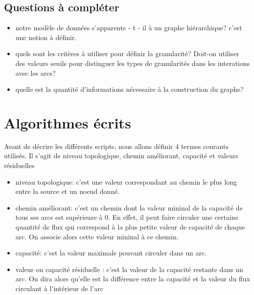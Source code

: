 \documentclass[onecolumn, 12pt]{article}
\begin{document}
\subsection {Questions \`a compl\'eter}
\begin{itemize}
\item notre mod\`ele de donn\'ees s'apparente - t - il \`a un graphe hi\'erarchique? c'est une notion \`a d\'efinir.
\item quels sont les crit\`eres \`a utiliser pour d\'efinir la granularit\'e? Doit-on utiliser des valeurs seuils pour distinguer les types de granularit\'es dans les interations avec les arcs?  
\item quelle est la quantit\'e d'informations n\'ecessaire \`a la construction du graphe?
\end{itemize}

\section {Algorithmes \'ecrits}

Avant de d\'ecrire les diff\'erents scripts, nous allons d\'efinir 4 termes courants utilis\'es. Il s'agit de niveau topologique, chemin am\'eliorant,  capacit\'e et valeurs r\'esiduelles 
\begin{itemize}
\item niveau topologique: c'est une valeur correspondant au chemin le plus long entre la source et un noeud donn\'e.
\item chemin am\'eliorant: c'est un chemin dont la valeur mininal de la capacit\'e de tous ses arcs est sup\'erieure \`a 0. En effet, il peut faire circuler une certaine quantit\'e de flux qui correspond \`a la plus petite valeur de capacit\'e de chaque arc.  On associe alors cette valeur mininal \`a ce chemin.   
\item capacit\'e: c'est la valeur maximale pouvant circuler dans un arc. 
\item valeur ou capacit\'e r\'esiduelle : c'est la valeur de la capacit\'e restante dans un arc. On dira alors qu'elle est la diff\'erence entre la capacit\'e et la valeur du flux circulant \`a l'int\'erieur de l'arc 
\end{itemize}
\end{document}
